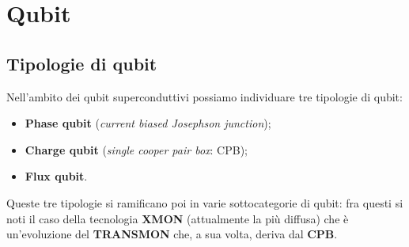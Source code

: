 \chapter{Qubit}
\noindent {}
\section{Tipologie di qubit}
Nell'ambito dei qubit superconduttivi possiamo individuare tre tipologie di qubit:
\begin{itemize}
    \item \textbf{Phase qubit} (\textit{current biased Josephson junction});
    \item \textbf{Charge qubit} (\textit{single cooper pair box}: CPB);
    \item \textbf{Flux qubit}.
\end{itemize}
Queste tre tipologie si ramificano poi in varie sottocategorie di qubit: fra questi si noti il caso della tecnologia \textbf{XMON} (attualmente la più diffusa) che è un'evoluzione del \textbf{TRANSMON} che, a sua volta, deriva dal \textbf{CPB}.

